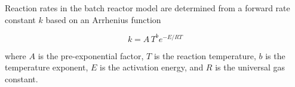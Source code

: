 \documentclass[12pt,titlepage]{article}
\begin{document}
Reaction rates in the batch reactor model are determined from a forward rate constant $k$ based on an Arrhenius function

\begin{equation}
    k = A\,T^b e^{-E / RT}
\end{equation}

\noindent where $A$ is the pre-exponential factor, $T$ is the reaction temperature, $b$ is the temperature exponent, $E$ is the activation energy, and $R$ is the universal gas constant.


\printbibliography
\end{document}
